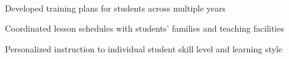 \documentclass[]{deedy-resume-openfont}
\begin{document}
\begin{minipage}[t]{0.66\textwidth}
 \\
\begin{tightemize}
	\item Developed training plans for students across multiple years
	\item Coordinated lesson schedules with students' families and teaching facilities
	\item Personalized instruction to individual student skill level and learning style
\end{tightemize}
\sectionsep



\end{minipage} 
\end{document}
